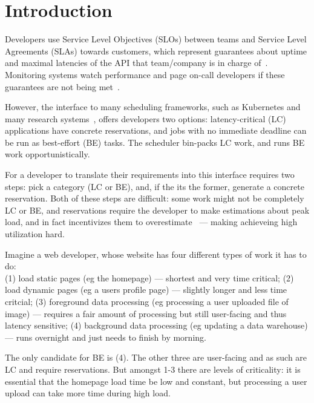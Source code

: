 \section{Introduction}

Developers use Service Level Objectives (SLOs) between teams and Service Level
Agreements (SLAs) towards customers, which represent guarantees about uptime and
maximal latencies of the API that team/company is in charge of~\cite{awssla}.
Monitoring systems watch performance and page on-call developers if these
guarantees are not being met~\cite{cloudwatch}.

However, the interface to many scheduling frameworks, such as Kubernetes and
many research systems~\cite{caladan}, offers developers two options:
latency-critical (LC) applications have concrete reservations, and jobs with no
immediate deadline can be run as best-effort (BE) tasks. The scheduler bin-packs
LC work, and runs BE work opportunistically.


For a developer to translate their requirements into this interface requires two
steps: pick a category (LC or BE), and, if the its the former, generate a
concrete reservation. Both of these steps are difficult: some work might not be
completely LC or BE, and reservations require the developer to make estimations
about peak load, and in fact incentivizes them to
overestimate~\cite*{overprovision} --- making achieveing high utilization hard.

Imagine a web developer, whose website has four different types of work it has
to do: \\
(1) load static pages (eg the homepage) --- shortest and very time critical; 
(2) load dynamic pages (eg a users profile page) --- slightly longer and less
time critcial;
(3) foreground data processing (eg processing a user uploaded file of image) ---
requires a fair amount of processing but still user-facing and thus latency
sensitive;
(4) background data processing (eg updating a data warehouse) --- runs overnight
and just needs to finish by morning.

The only candidate for BE is (4). The other three are user-facing and as such
are LC and require reservations. But amongst 1-3 there are levels of
criticality: it is essential that the homepage load time be low and constant,
but processing a user upload can take more time during high load.

